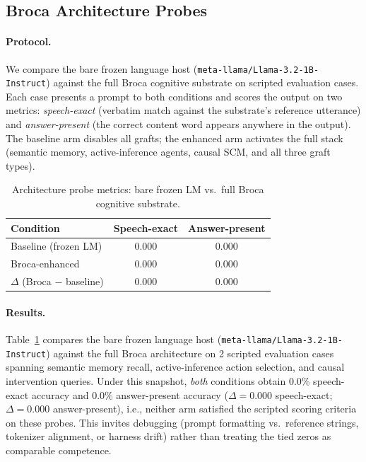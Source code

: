 \subsection{Broca Architecture Probes}
\label{subsec:exp-broca-arch}

\paragraph{Protocol.}
We compare the bare frozen language host (\texttt{meta-llama/Llama-3.2-1B-Instruct}) against the full Broca cognitive substrate on scripted evaluation cases. Each case presents a prompt to both conditions and scores the output on two metrics: \emph{speech-exact} (verbatim match against the substrate's reference utterance) and \emph{answer-present} (the correct content word appears anywhere in the output). The baseline arm disables all grafts; the enhanced arm activates the full stack (semantic memory, active-inference agents, causal SCM, and all three graft types).

\begin{table}[htbp]
\centering
\caption{Architecture probe metrics: bare frozen LM vs.\ full Broca cognitive substrate.}
\label{tab:broca-arch-probes}
\begin{tabular}{lcc}
\toprule
Condition & Speech-exact & Answer-present \\
\midrule
Baseline (frozen LM) & $0.000$ & $0.000$ \\
Broca-enhanced & $0.000$ & $0.000$ \\
$\Delta$ (Broca $-$ baseline) & $0.000$ & $0.000$ \\
\bottomrule
\end{tabular}
\end{table}

\paragraph{Results.}
Table~\ref{tab:broca-arch-probes} compares the bare frozen language host (\texttt{meta-llama/Llama-3.2-1B-Instruct}) against the full Broca architecture on 2 scripted evaluation cases spanning semantic memory recall, active-inference action selection, and causal intervention queries. 
Under this snapshot, \emph{both} conditions obtain 0.0\% speech-exact accuracy and 0.0\% answer-present accuracy ($\Delta = 0.000$ speech-exact; $\Delta = 0.000$ answer-present), i.e., neither arm satisfied the scripted scoring criteria on these probes. This invites debugging (prompt formatting vs.\ reference strings, tokenizer alignment, or harness drift) rather than treating the tied zeros as comparable competence. 

